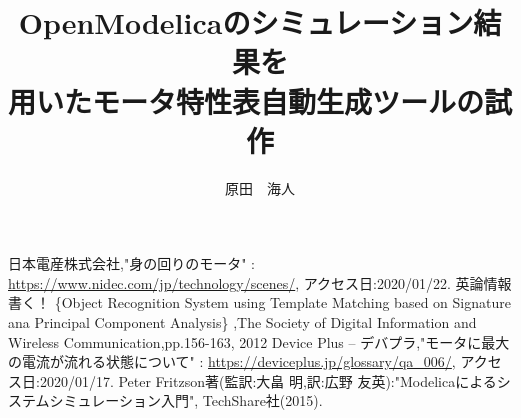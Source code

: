 \documentclass[uplatex, report, a4j, 10pt]{jsbook}
\title{OpenModelicaのシミュレーション結果を\\用いたモータ特性表自動生成ツールの試作}
\author{原田　海人}
\begin{document}
\maketitle


%
% 








%
\acknowledgment


%
\begin{thebibliography}{0}
	日本電産株式会社,"身の回りのモータ" : \url{https://www.nidec.com/jp/technology/scenes/}, アクセス日:2020/01/22.	
	 英論情報書く！	\{Object Recognition System using Template Matching based on Signature ana Principal Component Analysis\}
	,The Society of Digital Information and Wireless Communication,pp.156-163, 2012
	Device Plus – デバプラ,"モータに最大の電流が流れる状態について" : \url{https://deviceplus.jp/glossary/qa_006/}, アクセス日:2020/01/17.
	Peter Fritzson著(監訳:大畠 明,訳:広野 友英):"Modelicaによるシステムシミュレーション入門", TechShare社(2015).



\end{thebibliography}

\end{document}

